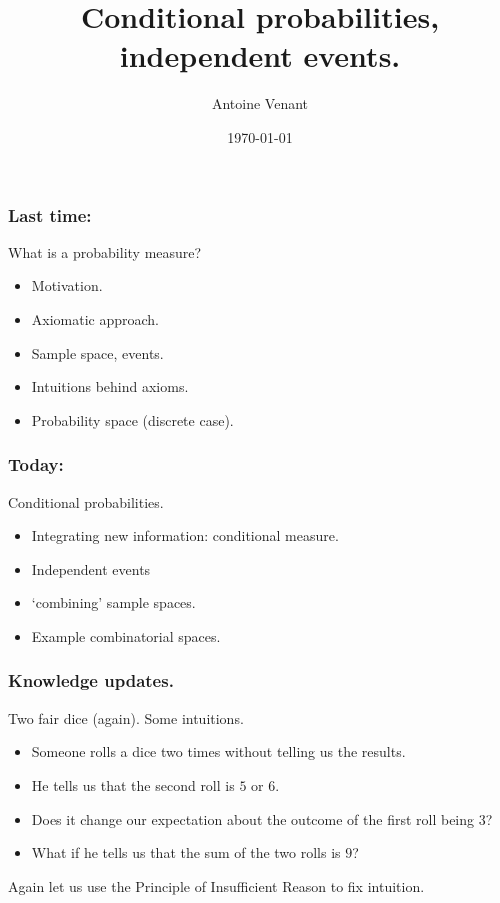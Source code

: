 \documentclass{beamer}
\begin{document}
\title{Conditional probabilities, independent events.} 
\author{Antoine Venant}
\date{\today}
\maketitle

\begin{frame}
  \frametitle{Last time:}
  \begin{block}{What is a probability measure?}
    \begin{itemize}
    \item Motivation.
    \item Axiomatic approach.
    \item Sample space, events.
    \item Intuitions behind axioms.
    \item Probability space (discrete case).
    \end{itemize}
  \end{block}
\end{frame}

\begin{frame}
  \frametitle{Today:}
  \begin{block}{Conditional probabilities.}
    \begin{itemize}
    \item Integrating new information: conditional measure.
    \item Independent events
    \item `combining' sample spaces.
    \item Example combinatorial spaces.
    \end{itemize}
  \end{block}
\end{frame}

\begin{frame}
  \frametitle{Knowledge updates.}
  \begin{exampleblock}{Two fair dice (again).}
    Some intuitions.
    \begin{itemize}
    \item Someone rolls a dice two times without telling us the results.
    \item He tells us that the second roll is $5$ or $6$.
    \item Does it change our expectation about the outcome of the first roll being $3$?
    \item What if he tells us that the sum of the two rolls is $9$?
    \end{itemize}
  \end{exampleblock}
  Again let us use the Principle of Insufficient Reason to fix intuition.
 
\end{frame}
\end{document}
